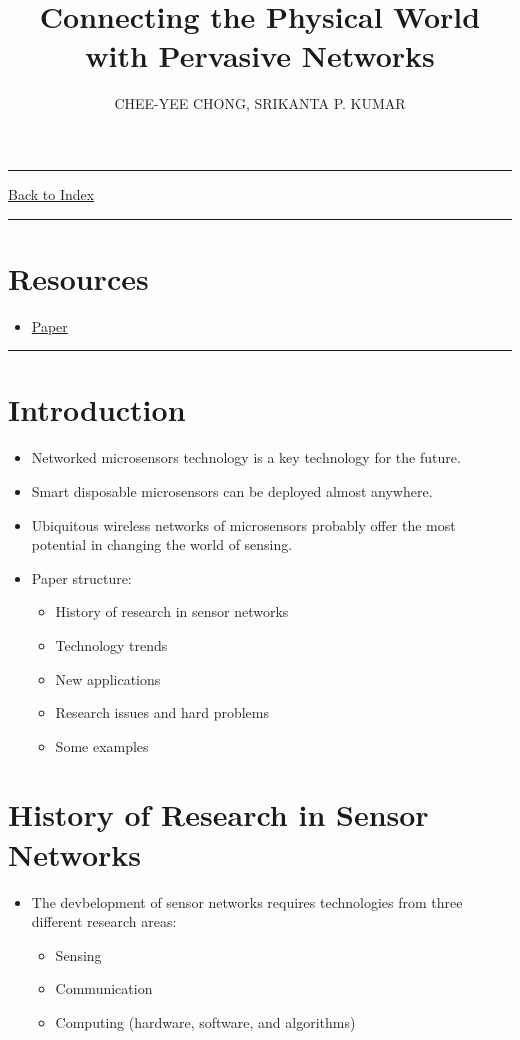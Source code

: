 \documentclass[letterpaper,10pt]{article}
\title{\textbf{Connecting the Physical World with Pervasive Networks}}
\author{CHEE-YEE CHONG, SRIKANTA P. KUMAR}
\newcommand{\panhline}{\begin{center}\rule{\textwidth}{1pt}\end{center}}
\begin{document}
\maketitle

\panhline
\href{../index.html}{Back to Index}

\panhline
\tableofcontents

\section*{Resources}

\begin{itemize}
	\item \href{../../Readings/Sensor Networks Evolution, Opportunities, and Challenges.pdf}{Paper}
\end{itemize}

\panhline

\section{Introduction}

\begin{itemize}
	\item Networked microsensors technology is a key technology for the future.
	\item Smart disposable microsensors can be deployed almost anywhere.
	\item Ubiquitous wireless networks of microsensors probably offer the most potential in changing the world of sensing.
	\item Paper structure:
	\begin{itemize}
		\item History of research in sensor networks
		\item Technology trends
		\item New applications
		\item Research issues and hard problems
		\item Some examples
	\end{itemize}
\end{itemize}
	
\section{History of Research in Sensor Networks}

\begin{itemize}
	\item The devbelopment of sensor networks requires technologies from three different research areas:
	\begin{itemize}
		\item Sensing
		\item Communication
		\item Computing (hardware, software, and algorithms)
	\end{itemize}
\end{itemize}
\end{document}
